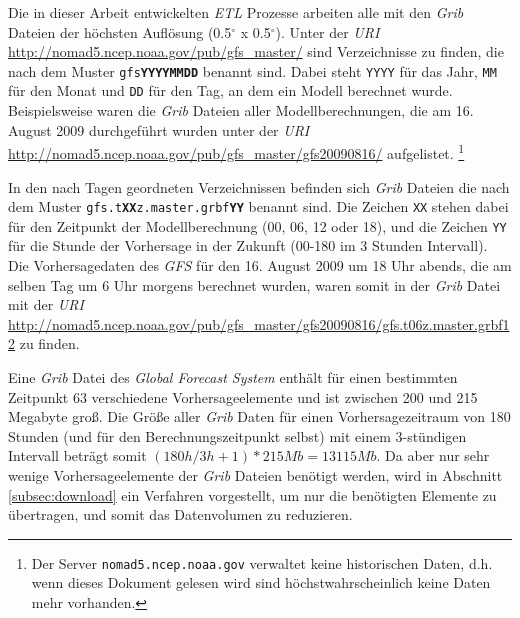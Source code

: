 Die in dieser Arbeit entwickelten \textit{ETL} Prozesse arbeiten alle
mit den \textit{Grib} Dateien der höchsten Auflösung
(0.5$^{\circ}$ x 0.5$^{\circ}$). Unter der \textit{URI}
\url{http://nomad5.ncep.noaa.gov/pub/gfs_master/} sind Verzeichnisse
zu finden, die nach dem Muster \texttt{gfs\textbf{YYYYMMDD}} benannt
sind. Dabei steht \texttt{YYYY} für das Jahr, \texttt{MM} für den
Monat und \texttt{DD} für den Tag, an dem ein Modell berechnet
wurde. Beispielsweise waren die \textit{Grib} Dateien aller
Modellberechnungen, die am 16. August 2009 durchgeführt wurden unter
der \textit{URI}
\url{http://nomad5.ncep.noaa.gov/pub/gfs_master/gfs20090816/}
aufgelistet.  \footnote{Der Server \texttt{nomad5.ncep.noaa.gov}
  verwaltet keine historischen Daten, d.h. wenn dieses Dokument
  gelesen wird sind höchstwahrscheinlich keine Daten mehr vorhanden.}

In den nach Tagen geordneten Verzeichnissen befinden sich
\textit{Grib} Dateien die nach dem Muster
\texttt{gfs.t\textbf{XX}z.master.grbf\textbf{YY}} benannt sind. Die Zeichen
\texttt{XX} stehen dabei für den Zeitpunkt der Modellberechnung (00,
06, 12 oder 18), und die Zeichen \texttt{YY} für die Stunde der
Vorhersage in der Zukunft (00-180 im 3 Stunden Intervall). Die
Vorhersagedaten des \textit{GFS} für den 16. August 2009 um 18 Uhr
abends, die am selben Tag um 6 Uhr morgens berechnet wurden, waren
somit in der \textit{Grib} Datei mit der \textit{URI}
\url{http://nomad5.ncep.noaa.gov/pub/gfs_master/gfs20090816/gfs.t06z.master.grbf12}
zu finden.

Eine \textit{Grib} Datei des \textit{Global Forecast System} enthält
für einen bestimmten Zeitpunkt 63 verschiedene Vorhersageelemente und
ist zwischen 200 und 215 Megabyte groß. Die Größe aller \textit{Grib}
Daten für einen Vorhersagezeitraum von 180 Stunden (und für den
Berechnungszeitpunkt selbst) mit einem 3-stündigen Intervall beträgt
somit $(180h / 3h + 1) * 215 Mb = 13115 Mb$. Da aber nur sehr wenige
Vorhersageelemente der \textit{Grib} Dateien benötigt werden, wird in
Abschnitt \ref{subsec:download} ein Verfahren vorgestellt, um nur die
benötigten Elemente zu übertragen, und somit das Datenvolumen zu
reduzieren.


